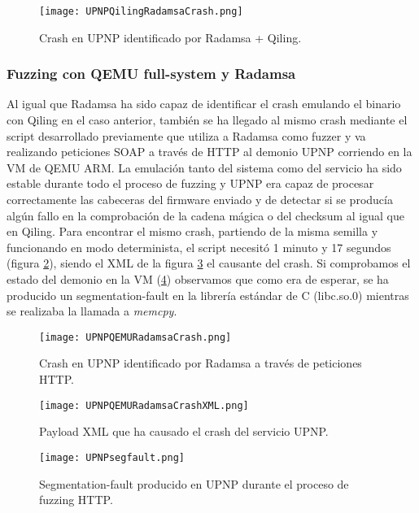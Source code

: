 \begin{figure}[H]
    \centering
    \texttt{[image: UPNPQilingRadamsaCrash.png]}
    \caption{Crash en UPNP identificado por Radamsa + Qiling.}
    \label{fig:UPNPQilingRadamsaCrash}
\end{figure}


\subsubsection{Fuzzing con QEMU full-system y Radamsa}
Al igual que Radamsa ha sido capaz de identificar el crash emulando el binario con Qiling en el caso anterior, también se ha llegado al mismo 
crash mediante el script desarrollado previamente que utiliza a Radamsa como fuzzer y va realizando peticiones SOAP a través de HTTP al 
demonio UPNP corriendo en la VM de QEMU ARM. La emulación tanto del sistema como del servicio ha sido estable durante todo el proceso de
fuzzing y UPNP era capaz de procesar correctamente las cabeceras del firmware enviado y de detectar si se producía algún fallo en la comprobación
de la cadena mágica o del checksum al igual que en Qiling. Para encontrar el mismo crash, partiendo de la misma semilla y funcionando en modo 
determinista, el script necesitó 1 minuto y 17 segundos (figura \ref{fig:UPNPQEMURadamsaCrash}), siendo el XML de la figura \ref{fig:UPNPQEMURadamsaCrashXML}
el causante del crash. Si comprobamos el estado del demonio en la VM (\ref{fig:UPNPsegfault}) observamos que como era de esperar, se ha producido un segmentation-fault
en la librería estándar de C (libc.so.0) mientras se realizaba la llamada a \textit{memcpy}.

\begin{figure}[H]
    \centering
    \texttt{[image: UPNPQEMURadamsaCrash.png]}
    \caption{Crash en UPNP identificado por Radamsa a través de peticiones HTTP.}
    \label{fig:UPNPQEMURadamsaCrash}
\end{figure}

\begin{figure}[H]
    \centering
    \texttt{[image: UPNPQEMURadamsaCrashXML.png]}
    \caption{Payload XML que ha causado el crash del servicio UPNP.}
    \label{fig:UPNPQEMURadamsaCrashXML}
\end{figure}

\begin{figure}[H]
    \centering
    \texttt{[image: UPNPsegfault.png]}
    \caption{Segmentation-fault producido en UPNP durante el proceso de fuzzing HTTP.}
    \label{fig:UPNPsegfault}
\end{figure}


